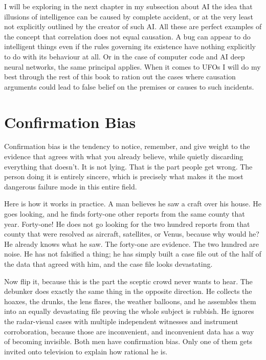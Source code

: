 I will be exploring in the next chapter in my subsection about AI the idea that
illusions of intelligence can be caused by complete accident, or at the very least
not explicitly outlined by the creator of such AI. All these are perfect examples of
the concept that correlation does not equal causation. A bug can appear to do
intelligent things even if the rules governing its existence have nothing explicitly
to do with its behaviour at all. Or in the case of computer code and AI deep neural
networks, the same principal applies. When it comes to UFOs I will do my best
through the rest of this book to ration out the cases where causation arguments
could lead to false belief on the premises or causes to such incidents.

\section{Confirmation Bias}\label{sec:confirmationbias}

Confirmation bias is the tendency to notice, remember, and give weight to the
evidence that agrees with what you already believe, while quietly discarding
everything that doesn't. It is not lying. That is the part people get wrong. The
person doing it is entirely sincere, which is precisely what makes it the most
dangerous failure mode in this entire field.

Here is how it works in practice. A man believes he saw a craft over his house.
He goes looking, and he finds forty-one other reports from the same county that
year. Forty-one! He does not go looking for the two hundred reports from that
county that were resolved as aircraft, satellites, or Venus, because why would he?
He already knows what he saw. The forty-one are evidence. The two hundred are
noise. He has not falsified a thing; he has simply built a case file out of the
half of the data that agreed with him, and the case file looks devastating.

Now flip it, because this is the part the sceptic crowd never wants to hear. The
debunker does exactly the same thing in the opposite direction. He collects the
hoaxes, the drunks, the lens flares, the weather balloons, and he assembles them
into an equally devastating file proving the whole subject is rubbish. He ignores
the radar-visual cases with multiple independent witnesses and instrument
corroboration, because those are inconvenient, and inconvenient data has a way of
becoming invisible. Both men have confirmation bias. Only one of them gets invited
onto television to explain how rational he is.

